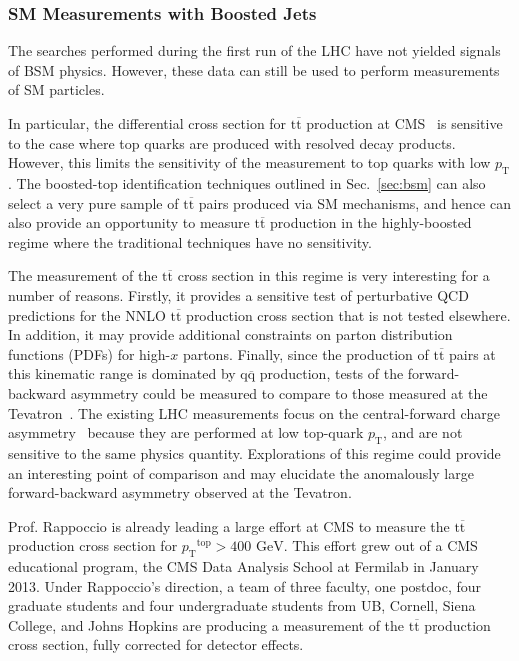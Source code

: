 \documentclass[12pt]{proposalnsf}
\newcommand{\GeVc}{\ensuremath{\mathrm{GeV}}}
\newcommand{\pt} {\ensuremath{p_\mathrm{T}}\xspace}
\newcommand{\ttbar}        {\ensuremath{\mathrm{t}\overline{\mathrm{t}}}}
\newcommand{\qqbar}        {\ensuremath{\mathrm{q}\overline{\mathrm{q}}}}
\begin{document}
\subsubsection{SM Measurements with Boosted Jets}
\label{sec:topxs}

The searches performed during the first run of the LHC have not
yielded signals of BSM physics. However, these data can still be used
to perform measurements of SM particles. 

In particular, the differential cross section for $\ttbar$ production
at CMS~\cite{Chatrchyan:2012saa} is sensitive to the case where top
quarks are produced with resolved decay products. However, this limits
the sensitivity of the measurement to top quarks with low $\pt$. The
boosted-top identification techniques outlined in Sec.~\ref{sec:bsm}
can also select a very pure sample of $\ttbar$ pairs produced via SM
mechanisms, and hence can also provide an opportunity to measure
$\ttbar$ production in the highly-boosted regime where the traditional
techniques have no sensitivity. 

The measurement of the $\ttbar$ cross section in this regime is very
interesting for a number of reasons. Firstly,
it provides a sensitive test of perturbative QCD predictions for the
NNLO $\ttbar$ production cross section that is not tested
elsewhere. In addition, it may provide additional constraints on
parton distribution functions (PDFs) for high-$x$ partons. Finally,
since the production of $\ttbar$ pairs at this kinematic range is
dominated by $\qqbar$ production, tests of the forward-backward
asymmetry could be measured to compare to those measured at the
Tevatron~\cite{Deliot:2013gla}. The existing LHC measurements focus on the
central-forward charge asymmetry~\cite{Chatrchyan:2011hk,ATLAS:2012an}
because they are performed at
low top-quark $\pt$, and are not sensitive to the same physics
quantity. Explorations of this regime could provide an interesting
point of comparison and may elucidate the anomalously large
forward-backward asymmetry observed at the Tevatron. 

Prof. Rappoccio is already leading a large effort at CMS to measure the
$\ttbar$ production cross section for $\pt^\mathrm{top} > 400$
\GeVc. This effort grew out of a CMS educational program, the CMS Data
Analysis School at Fermilab in January 2013. Under
Rappoccio's direction, a team of three faculty, one postdoc, four
graduate students and four undergraduate students from UB, Cornell,
Siena College, and Johns Hopkins are producing a
measurement of the $\ttbar$ production cross section, fully corrected
for detector effects. 
\end{document}
